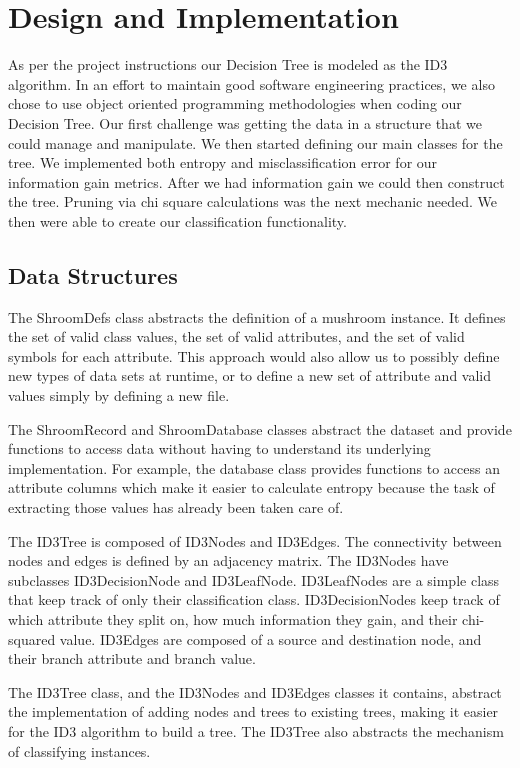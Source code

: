\documentclass{IEEEtran}
\begin{document}
\section{Design and Implementation}
As per the project instructions our Decision Tree is modeled as the
ID3 algorithm. In an effort to maintain good software engineering
practices, we also chose to use object oriented programming
methodologies when coding our Decision Tree. Our first challenge was
getting the data in a structure that we could manage and
manipulate. We then started defining our main classes for the tree. We
implemented both entropy and misclassification error for our
information gain metrics. After we had information gain we could then
construct the tree. Pruning via chi square calculations was the next
mechanic needed. We then were able to create our classification
functionality.

\subsection{Data Structures}
The ShroomDefs class abstracts the definition of a mushroom
instance. It defines the set of valid class values, the set of valid
attributes, and the set of valid symbols for each attribute. This
approach would also allow us to possibly define new types of data sets
at runtime, or to define a new set of attribute and valid values
simply by defining a new file. 

The ShroomRecord and ShroomDatabase classes abstract the dataset and
provide functions to access data without having to understand its
underlying implementation. For example, the database class provides
functions to access an attribute columns which make it
easier to calculate entropy because the task of extracting those
values has already been taken care of.

The ID3Tree is composed of ID3Nodes and ID3Edges. The connectivity
between nodes and edges is defined by an adjacency matrix. The
ID3Nodes have subclasses ID3DecisionNode and ID3LeafNode. ID3LeafNodes
are a simple class that keep track of only their classification
class. ID3DecisionNodes keep track of which attribute they split on,
how much information they gain, and their chi-squared value. ID3Edges
are composed of a source and destination node, and their branch
attribute and branch value.

The ID3Tree class, and the ID3Nodes and ID3Edges classes it contains,
abstract the implementation of adding nodes and trees to existing
trees, making it easier for the ID3 algorithm to build a tree. The
ID3Tree also abstracts the mechanism of classifying instances.
\end{document}
